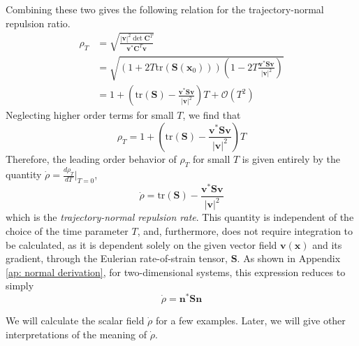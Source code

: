 \documentclass[onecolumn,3p]{elsarticle}
\begin{document}
	Combining these two gives the following relation for the trajectory-normal repulsion ratio.
	\begin{equation}
	\begin{aligned}
	\rho_T  &= \sqrt{\frac{
			| \mathbf{v} |^2 \det\mathbf{C}^T }{
			\mathbf{v} ^*\mathbf{C}^T  \mathbf{v} 
		}} \\
	&= \sqrt{\left(1 + 2T\text{tr}\left(\mathbf{S}\left(\mathbf{x}_0\right)\right)\right)\left(1-2T \frac{\mathbf{v} ^*\mathbf{S} \mathbf{v} }{\left|\mathbf{v} \right|^2}\right)} \\
	&= 1+\left(\text{tr}(\mathbf{S} )-\frac{\mathbf{v} ^* \mathbf{S} \mathbf{v} }{\left|\mathbf{v} \right|^2}\right)T + \mathcal{O}(T^2)
	\end{aligned}
	\end{equation}
	Neglecting higher order terms for small $T$, we find that
	\begin{equation}
	\rho_T  = 1+\left(\text{tr}(\mathbf{S} )-\frac{\mathbf{v} ^* \mathbf{S} \mathbf{v} }{\left|\mathbf{v} \right|^2}\right)T
	\label{eq: local Rho}
	\end{equation}
	Therefore, the leading order behavior of \(\rho_T \) for small $T$ is given entirely by the quantity $\dot \rho = \frac{d \rho_T}{dT}|_{T=0}$,
	\begin{equation}
	\dot \rho   = \text{tr}(\mathbf{S} )-\frac{\mathbf{v} ^* \mathbf{S} \mathbf{v} }{\left|\mathbf{v} \right|^2}
	\label{eq: Leading Order Behavior}
	\end{equation}
	which is the {\it trajectory-normal repulsion rate}.
	This quantity is independent of the choice of the time parameter \(T\), and, furthermore, does not require integration to be calculated, as it is dependent solely on the given %
	vector field $\mathbf{v}(\mathbf{x})$
	and its gradient, through the Eulerian rate-of-strain tensor, 
	$\mathbf{S} $. As shown in Appendix \ref{ap: normal derivation}, for two-dimensional systems, this expression reduces to simply
	\begin{equation}
		\dot{\rho}  = \mathbf{n} ^*\mathbf{S} \mathbf{n}
		\label{eq: Repulsion Rate}
	\end{equation}
	
	We will calculate the scalar field $\dot \rho  $ for a few examples. Later, we will give other interpretations of the meaning of $\dot \rho  $.
	
		
\end{document}
